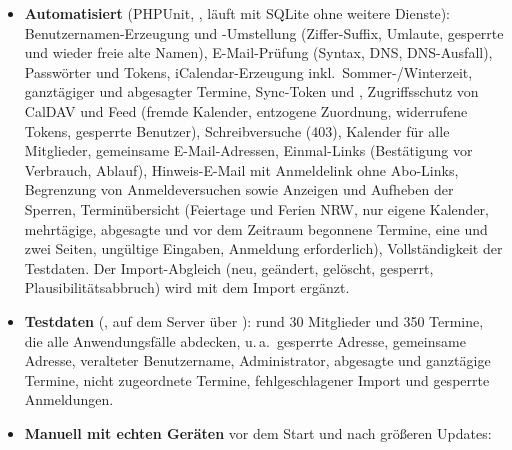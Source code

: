 \begin{itemize}
  \item \textbf{Automatisiert} (PHPUnit, , läuft mit
        SQLite ohne weitere Dienste): Benutzernamen-Erzeugung und
        -Umstellung (Ziffer-Suffix, Umlaute, gesperrte und wieder freie
        alte Namen), E-Mail-Prüfung (Syntax, DNS, DNS-Ausfall),
        Passwörter und Tokens, iCalendar-Erzeugung inkl.\
        Sommer-/Winterzeit, ganztägiger und abgesagter Termine,
        Sync-Token und , Zugriffsschutz von
        CalDAV und Feed (fremde Kalender, entzogene Zuordnung, widerrufene
        Tokens, gesperrte Benutzer), Schreibversuche (403),
        Kalender \glqq für alle Mitglieder\grqq, gemeinsame
        E-Mail-Adressen, Einmal-Links (Bestätigung vor Verbrauch, Ablauf),
        Hinweis-E-Mail mit Anmeldelink ohne Abo-Links, Begrenzung von
        Anmeldeversuchen sowie Anzeigen und Aufheben der Sperren,
        Terminübersicht (Feiertage und Ferien NRW, nur eigene Kalender,
        mehrtägige, abgesagte und vor dem Zeitraum begonnene Termine, eine und
        zwei Seiten, ungültige Eingaben, Anmeldung erforderlich),
        Vollständigkeit der Testdaten. Der Import-Abgleich (neu, geändert,
        gelöscht, gesperrt, Plausibilitätsabbruch) wird mit dem Import
        ergänzt.
  \item \textbf{Testdaten} (, auf dem Server über
        \code{-X}): rund 30 Mitglieder und 350 Termine, die alle
        Anwendungsfälle abdecken, u.\,a.\ gesperrte Adresse, gemeinsame
        Adresse, veralteter Benutzername, Administrator, abgesagte und
        ganztägige Termine, nicht zugeordnete Termine, fehlgeschlagener
        Import und gesperrte Anmeldungen.
  \item \textbf{Manuell mit echten Geräten} vor dem Start und nach größeren
        Updates:
\end{itemize}

